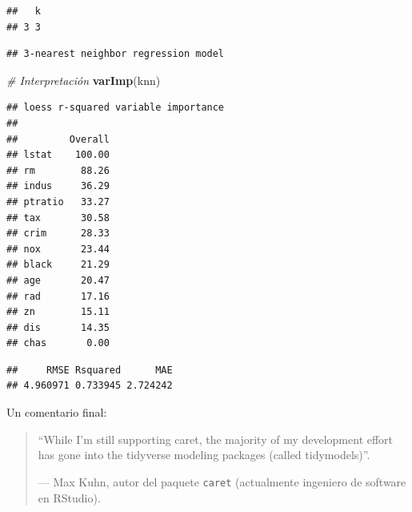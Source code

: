 \documentclass[]{book}
\newenvironment{Shaded}{\begin{snugshade}}{\end{snugshade}}
\newcommand{\KeywordTok}[1]{\textcolor[rgb]{0.13,0.29,0.53}{\textbf{#1}}}
\newcommand{\DataTypeTok}[1]{\textcolor[rgb]{0.13,0.29,0.53}{#1}}
\newcommand{\CommentTok}[1]{\textcolor[rgb]{0.56,0.35,0.01}{\textit{#1}}}
\newcommand{\OperatorTok}[1]{\textcolor[rgb]{0.81,0.36,0.00}{\textbf{#1}}}
\newcommand{\NormalTok}[1]{#1}
\theoremstyle{break}
\theoremstyle{definition}
\theoremstyle{definition}
\theoremstyle{definition}
\theoremstyle{remark}
\begin{document}
\begin{Shaded}
\end{Shaded}

\begin{verbatim}
##   k
## 3 3
\end{verbatim}

\begin{Shaded}
\end{Shaded}

\begin{verbatim}
## 3-nearest neighbor regression model
\end{verbatim}

\begin{Shaded}
\begin{Highlighting}[]
\CommentTok{# Interpretación}
\KeywordTok{varImp}\NormalTok{(knn)}
\end{Highlighting}
\end{Shaded}

\begin{verbatim}
## loess r-squared variable importance
## 
##         Overall
## lstat    100.00
## rm        88.26
## indus     36.29
## ptratio   33.27
## tax       30.58
## crim      28.33
## nox       23.44
## black     21.29
## age       20.47
## rad       17.16
## zn        15.11
## dis       14.35
## chas       0.00
\end{verbatim}

\begin{Shaded}
\end{Shaded}

\begin{verbatim}
##     RMSE Rsquared      MAE 
## 4.960971 0.733945 2.724242
\end{verbatim}

Un comentario final:

\begin{quote}
``While I'm still supporting caret, the majority of my development
effort has gone into the tidyverse modeling packages (called
tidymodels)''.

--- Max Kuhn, autor del paquete \texttt{caret} (actualmente ingeniero de
software en RStudio).
\end{quote}
\end{document}
